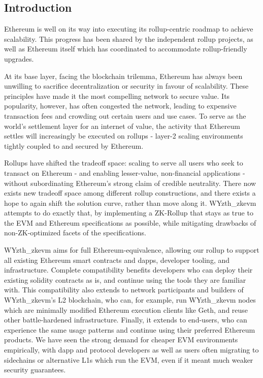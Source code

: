 \documentclass[9pt,oneside]{amsart}
\begin{document}
\setlength{\columnsep}{20pt}
\begin{multicols}{2}

\section{Introduction}
Ethereum is well on its way into executing its rollup-centric roadmap to achieve scalability\cite{rollup-centric}. This progress has been shared by the independent rollup projects, as well as Ethereum itself which has coordinated to accommodate rollup-friendly upgrades. 

At its base layer, facing the blockchain trilemma, Ethereum has always been unwilling to sacrifice decentralization or security in favour of scalability. These principles have made it the most compelling network to secure value. Its popularity, however, has often congested the network, leading to expensive transaction fees and crowding out certain users and use cases. To serve as the world's settlement layer for an internet of value, the activity that Ethereum settles will increasingly be executed on rollups - layer-2 scaling environments tightly coupled to and secured by Ethereum.

Rollups have shifted the tradeoff space: scaling to serve all users who seek to transact on Ethereum - and enabling lesser-value, non-financial applications - without subordinating Ethereum's strong claim of credible neutrality. There now exists new tradeoff space among different rollup constructions, and there exists a hope to again shift the solution curve, rather than move along it. WYzth_zkevm attempts to do exactly that, by implementing a ZK-Rollup that stays as true to the EVM and Ethereum specifications as possible, while mitigating drawbacks of non-ZK-optimized facets of the specifications.

WYzth_zkevm aims for full Ethereum-equivalence, allowing our rollup to support all existing Ethereum smart contracts and dapps, developer tooling, and infrastructure. Complete compatibility benefits developers who can deploy their existing solidity contracts as is, and continue using the tools they are familiar with. This compatibility also extends to network participants and builders of WYzth_zkevm's L2 blockchain, who can, for example, run WYzth_zkevm nodes which are minimally modified Ethereum execution clients like Geth, and reuse other battle-hardened infrastructure. Finally, it extends to end-users, who can experience the same usage patterns and continue using their preferred Ethereum products. We have seen the strong demand for cheaper EVM environments empirically, with dapp and protocol developers as well as users often migrating to sidechains or alternative L1s which run the EVM, even if it meant much weaker security guarantees.


\end{multicols}
\end{document}
